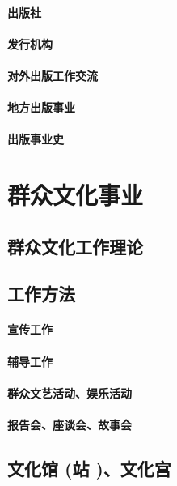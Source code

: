 \documentclass[UTF8]{../../ApplicationUniverse}
\begin{document}
        \subsubsection{出版社}
        \subsubsection{发行机构}
        \subsubsection{对外出版工作交流}
        \subsubsection{地方出版事业}
        \subsubsection{出版事业史}






\chapter{群众文化事业}
\section{群众文化工作理论}
\section{工作方法}
    \subsubsection{宣传工作}
    \subsubsection{辅导工作}
    \subsubsection{群众文艺活动、娱乐活动}
    \subsubsection{报告会、座谈会、故事会}
\section{文化馆 (站 )、文化宫}
\end{document}
